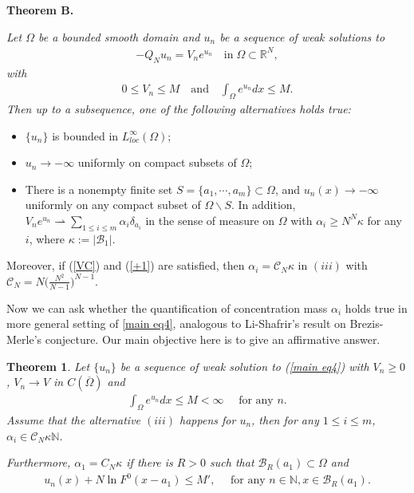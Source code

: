 \documentclass[11pt]{amsart}
\numberwithin{equation}{section}
\newtheorem{thm}{Theorem}[section]
\newcommand{\N}{\mathbb{N}}
\begin{document}
\medskip
\noindent
{\bf Theorem B.}
{\it Let $\Omega$ be a bounded smooth domain and $u_{n}$ be a sequence of weak solutions to
\begin{align}\label{main eq4}
-Q_{N}u_{n} =V_{n}e^{u_{n}} \quad \mbox{in} \; \Omega\subset\mathbb{R}^{N},
\end{align}
 with
\begin{align}\label{Vn}
0\leq V_{n}\leq M \quad\mbox{and}\quad \int_{\Omega}e^{u_{n}}dx\leq M .
\end{align}
Then up to a subsequence, one of the following alternatives holds true:
\begin{itemize}
\item[(i)] $\{u_{n}\}$ is bounded in $L^{\infty}_{loc}(\Omega)$;
\item[(ii)] $u_{n}\rightarrow-\infty$ uniformly on compact subsets of $\Omega$;
\item[(iii)] There is a nonempty finite set $S=\{a_{1},\cdots,a_m\}\subset\Omega$, and $u_{n}(x)\rightarrow-\infty$ uniformly on any compact subset of $\Omega\backslash S$. In addition, $V_{n}e^{u_{n}}\rightharpoonup\sum_{1\le i \le m}\alpha_{i}\delta_{a_{i}}$ in the sense of measure on $\Omega$ with $\alpha_{i}\geq N^{N}\kappa$ for any $i$, where $\kappa:=|\mathcal{B}_1|$.
\end{itemize}
Moreover, if (\ref{VC}) and (\ref{+1}) are satisfied, then $\alpha_i=\mathcal{C}_{N}\kappa$ in $(iii)$ with
$\mathcal{C}_{N} = N\Big(\frac{N^2}{N-1}\Big)^{N-1}$.}

\medskip
Now we can ask whether the quantification of concentration mass $\alpha_i$ holds true in more general setting of \eqref{main eq4}, analogous to Li-Shafrir's result on Brezis-Merle's conjecture. Our main objective here is to give an affirmative answer.

\begin{thm}\label{thm1}
Let $\{u_{n}\}$ be a sequence of weak solution to (\ref{main eq4}) with $V_{n}\geq0$, $V_{n}\rightarrow V$ in $C(\overline{\Omega})$ and
\begin{align}\label{energy}
\int_{\Omega}e^{u_{n}}dx\leq M < \infty\quad\mbox{ for any } n.
\end{align}
Assume that the alternative $(iii)$ happens for $u_n$, then for any $1\le i \le m$, $\alpha_i \in \mathcal{C}_{N}\kappa\N$.

Furthermore, $\alpha_1 = {C}_{N}\kappa$ if there is $R > 0$ such that $\mathcal{B}_R(a_1) \subset \Omega$ and
\begin{align}\label{th6}
u_{n}(x)+N\ln F^{0}(x-a_1)\leq M', \quad \mbox{ for any } n \in \N, x\in\mathcal{B}_{R}(a_1).
\end{align}
\end{thm}
\end{document}
